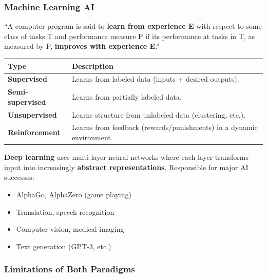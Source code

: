 \bigseparator

\subsubsection{Machine Learning AI}

\begin{defbox}
``A computer program is said to \textbf{learn from experience E} with respect to some class of tasks T and performance measure P if its performance at tasks in T, as measured by P, \textbf{improves with experience E}.''
\end{defbox}

\begin{center}
\renewcommand{\arraystretch}{1.3}
\begin{tabular}{@{} l p{8cm} @{}}
\toprule
\textbf{Type} & \textbf{Description} \\
\midrule
\textbf{Supervised} & Learns from labeled data (inputs + desired outputs). \\
\textbf{Semi-supervised} & Learns from partially labeled data. \\
\textbf{Unsupervised} & Learns structure from unlabeled data (clustering, etc.). \\
\textbf{Reinforcement} & Learns from feedback (rewards/punishments) in a dynamic environment. \\
\bottomrule
\end{tabular}
\end{center}

\begin{thmbox}
\textbf{Deep learning} uses multi-layer neural networks where each layer transforms input into increasingly \textbf{abstract representations}. Responsible for major AI successes:
\begin{itemize}
  \item AlphaGo, AlphaZero (game playing)
  \item Translation, speech recognition
  \item Computer vision, medical imaging
  \item Text generation (GPT-3, etc.)
\end{itemize}
\end{thmbox}

\bigseparator

\subsubsection{Limitations of Both Paradigms}

